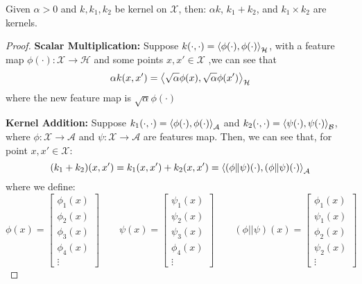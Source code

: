 \begin{theorem}
    \label{thm:scalar-add-mult}
    Given $\alpha>0$ and $k, k_1, k_2$ be kernel on $\mathcal{X}$, then: $\alpha k$, $k_1 + k_2$, and $k_1\times k_2$ are kernels.
\end{theorem}
\begin{proof}
    \textbf{Scalar Multiplication: } Suppose $k(\cdot, \cdot) = \left\langle \phi(\cdot), \phi(\cdot) \right\rangle_\mathcal{H}$, with a feature map $\phi(\cdot) : \mathcal{X}\rightarrow\mathcal{H}$ and some points $x, x'\in\mathcal{X}$ ,we can see that 
    \begin{equation*}
        \alpha k(x, x') = \left\langle \sqrt{\alpha}\phi(x), \sqrt{\alpha}\phi(x') \right\rangle_\mathcal{H}
    \end{equation*} 
    where the new feature map is $\sqrt{\alpha}\phi(\cdot)$

    \textbf{Kernel Addition: } Suppose $k_1(\cdot, \cdot) = \left\langle \phi(\cdot), \phi(\cdot) \right\rangle_\mathcal{A}$ and $k_2(\cdot, \cdot) = \left\langle \psi(\cdot),\psi(\cdot) \right\rangle_\mathcal{B}$, where $\phi:\mathcal{X}\rightarrow\mathcal{A}$ and $\psi:\mathcal{X}\rightarrow\mathcal{A}$ are features map. Then, we can see that, for point $x, x'\in\mathcal{X}$:
    \begin{equation*}
        (k_1 + k_2)(x,x') = k_1(x,x') + k_2(x,x') = \left\langle  (\phi\|\psi)(\cdot), (\phi\|\psi)(\cdot)  \right\rangle_{\mathcal{A}}
    \end{equation*}
    where we define: 
    \begin{equation*}
        \phi(x) = \begin{bmatrix}
            \phi_1(x) \\ \phi_2(x) \\ \phi_3(x) \\ \phi_4(x) \\\vdots 
        \end{bmatrix} \qquad \psi(x) = \begin{bmatrix}
            \psi_1(x) \\ \psi_2(x) \\ \psi_3(x) \\ \phi_4(x) \\\vdots 
        \end{bmatrix} \qquad 
        (\phi||\psi)(x) = \begin{bmatrix}
            \phi_1(x) \\ \psi_1(x) \\ \phi_2(x) \\ \psi_2(x) \\\vdots 
        \end{bmatrix} \qquad 
    \end{equation*}


\end{proof}

